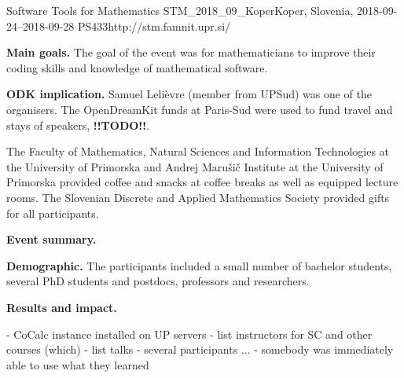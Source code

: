 \begin{event}{Software Tools for Mathematics}%
{STM_2018_09_Koper}{Koper, Slovenia, 2018-09-24--2018-09-28}%
{PS}{43}{3}{http://stm.famnit.upr.si/}

\textbf{Main goals.} The goal of the event was for mathematicians
to improve their coding skills and knowledge of mathematical software.

\textbf{ODK implication.} Samuel Lelièvre (\ODK member from UPSud) was one of
the organisers. The OpenDreamKit funds at Paris-Sud were used to fund travel
and stays of speakers, \textbf{!!TODO!!}.

The Faculty of Mathematics, Natural Sciences and Information Technologies at the University of Primorska
and Andrej Marušič Institute at the University of Primorska 
provided coffee and snacks at coffee breaks as well as equipped lecture rooms. 
The Slovenian Discrete and Applied Mathematics Society provided gifts for all participants.

\textbf{Event summary.} 

\textbf{Demographic.} 
The participants included a small number of bachelor students,
several PhD students and postdocs, professors and researchers.

\textbf{Results and impact.}

- CoCalc instance installed on UP servers
- list instructors for SC and other courses (which)
- list talks
- several participants ...
- somebody was immediately able to use what they learned


\end{event}
